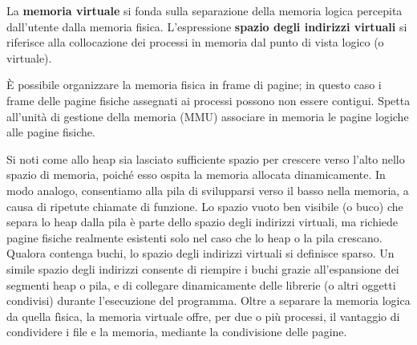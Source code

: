 \documentclass[11pt,a4paper]{article}
\begin{document}
La \textbf{memoria virtuale} si fonda sulla separazione della memoria logica percepita dal­l'utente dalla memoria fisica.
L'espressione \textbf{spazio degli indirizzi virtuali} si riferisce alla collocazione dei processi in
memoria dal punto di vista logico (o virtuale).

È possibile organizzare la memoria fisica in frame di pagine; in questo caso i frame
delle pagine fisiche assegnati ai processi possono non essere contigui. Spetta all'unità di ge­stione della memoria (MMU) associare in memoria le pagine logiche alle pagine fisiche.

Si noti come allo heap sia lasciato sufficiente spazio per crescere ver­so l'alto nello spazio di memoria, poiché esso ospita la memoria allocata dinamicamente. In
modo analogo, consentiamo alla pila di svilupparsi verso il basso nella memoria, a causa di
ripetute chiamate di funzione. Lo spazio vuoto ben visibile (o buco) che separa lo heap dal­la pila è parte dello spazio degli indirizzi virtuali, ma richiede pagine fisiche realmente esi­stenti solo nel caso che lo heap o la pila crescano. Qualora contenga buchi, lo spazio degli
indirizzi virtuali si definisce sparso. Un simile spazio degli indirizzi consente di riempire i buchi grazie all'espansione dei segmenti heap o pila, e di collegare dinamicamente delle librerie (o altri oggetti condivisi) durante l'esecuzione del programma.
Oltre a separare la memoria logica da quella fìsica, la memoria virtuale offre, per due o
più processi, il vantaggio di condividere i file e la memoria, mediante la condivisione delle
pagine.
\end{document}
